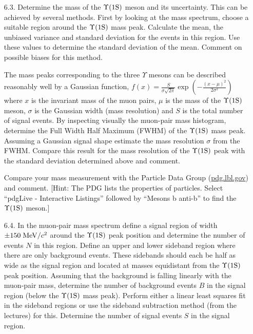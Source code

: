 \begin{enumerate}


\item [6.3.] Determine the mass of the $\Upsilon \rm (1S)$ meson and its uncertainty.
This can be achieved by several methods.
First by looking at the mass spectrum, choose a suitable region around the $\Upsilon \rm (1S)$ mass peak.
Calculate the mean, the unbiased variance and standard deviation for the events in this region.
Use these values to determine the standard deviation of the mean.
Comment on possible biases for this method.

The mass peaks corresponding to the three $\Upsilon$ mesons can be described reasonably well by a Gaussian function,
$f(x) = \frac{S}{\sigma \sqrt{2\pi}} \exp{\left( -\frac{(x-\mu)^2}{2\sigma^2} \right)}$
where $x$ is the invariant mass of the muon pairs, $\mu$ is the mass of the $\Upsilon \rm (1S)$ meson, $\sigma$ is the Gaussian width (mass resolution) and $S$ is the total number of signal events. 
By inspecting visually the muon-pair mass histogram, determine the Full Width Half Maximum (FWHM) of the $\Upsilon \rm (1S)$ mass peak.
Assuming a Gaussian signal shape estimate the mass resolution $\sigma$ from the FWHM. %
Compare this result for the mass resolution of the $\Upsilon \rm (1S)$ peak with the standard deviation determined above and comment.

Compare your mass measurement with the Particle Data Group (\href{https://pdg.lbl.gov/}{pdg.lbl.gov}) and comment.
[Hint: The PDG lists the properties of particles. Select ``pdgLive - Interactive Listings'' followed by ``Mesons b anti-b'' to find the $\Upsilon \rm (1S)$ meson.]



\item [6.4.] In the muon-pair mass spectrum define a signal region of width $\pm 150\; {\rm MeV}/c^2$ around the $\Upsilon \rm (1S)$ peak position and determine the number of events $N$ in this region.
Define an upper and lower sideband region where there are only background events.
These sidebands should each be half as wide as the signal region and located at masses equidistant from the $\Upsilon \rm (1S)$ peak position.
Assuming that the background is falling linearly with the muon-pair mass, determine the number of background events $B$ in the signal region (below the $\Upsilon \rm (1S)$ mass peak).
Perform either a linear least squares fit in the sideband regions or use the sideband subtraction method (from the lectures) for this.
Determine the number of signal events $S$ in the signal region.


\end{enumerate}
